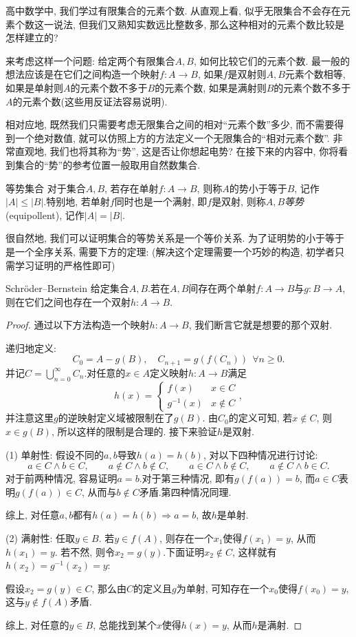 高中数学中, 我们学过有限集合的元素个数. 从直观上看, 似乎无限集合不会存在元素个数这一说法, 但我们又熟知实数远比整数多, 那么这种相对的元素个数比较是怎样建立的? 

来考虑这样一个问题: 给定两个有限集合$A, B$, 如何比较它们的元素个数. 最一般的想法应该是在它们之间构造一个映射$f: A \to B$, 如果$f$是双射则$A, B$元素个数相等, 如果是单射则$A$的元素个数不多于$B$的元素个数, 如果是满射则$B$的元素个数不多于$A$的元素个数(这些用反证法容易说明). 

相对应地, 既然我们只需要考虑无限集合之间的相对“元素个数”多少, 而不需要得到一个绝对数值, 就可以仿照上方的方法定义一个无限集合的“相对元素个数”. 非常直观地, 我们也将其称为“势”, 这是否让你想起电势? 在接下来的内容中, 你将看到集合的“势”的参考位置一般取用自然数集合. 

\begin{definition}{等势集合}
	对于集合$A, B$, 若存在单射$f: A \to B$, 则称$A$的势小于等于$B$, 记作$|A| \leq |B|$.特别地, 若单射$f$同时也是一个满射, 即$f$是双射, 则称$A, B$\textit{等势}(equipollent), 记作$|A|=|B|$.
\end{definition}

很自然地, 我们可以证明集合的等势关系是一个等价关系. 为了证明势的小于等于是一个全序关系, 需要下方的定理: (解决这个定理需要一个巧妙的构造, 初学者只需学习证明的严格性即可)

\begin{theorem}{Schröder–Bernstein}
	给定集合$A, B$.若在$A, B$间存在两个单射$f: A \to B$与$g: B \to A$, 则在它们之间也存在一个双射$h: A \to B$.
\end{theorem}
\begin{proof}
	通过以下方法构造一个映射$h: A \to B$, 我们断言它就是想要的那个双射. 
	
	递归地定义: $$C_0 = A - g(B), \quad C_{n+1}=g(f(C_n))~~\forall n \geq 0.$$
	并记$C = \bigcup_{n=0}^{\infty} C_n$.对任意的$x \in A$定义映射$h:  A\to B$满足$$h(x) = \begin{cases}
 f(x) &  x \in C \\
 g^{-1}(x) &  x \notin C
\end{cases}, $$并注意这里$g$的逆映射定义域被限制在了$g(B)$. 由$C_0$的定义可知, 若$x \notin C$, 则$x \in g(B)$, 所以这样的限制是合理的. 接下来验证$h$是双射. 

(1) 单射性: 假设不同的$a, b$导致$h(a)=h(b)$, 对以下四种情况进行讨论: $$a \in C \wedge b \in C, \qquad a \notin C \wedge b \notin C, \qquad a \in C \wedge b \notin C, \qquad a \notin C \wedge b \in C.$$
对于前两种情况, 容易证明$a=b$.对于第三种情况, 即有$g(f(a))=b$, 而$a \in C$表明$g(f(a)) \in C$, 从而与$b \notin C$矛盾.第四种情况同理. 

综上, 对任意$a, b$都有$h(a)=h(b) \Rightarrow a=b$, 故$h$是单射. 

(2) 满射性: 任取$y \in B$. 若$y \in f(A)$, 则存在一个$x_1$使得$f(x_1)=y$, 从而$h(x_1)=y$. 若不然, 则令$x_2=g(y)$.下面证明$x_2 \notin C$, 这样就有$h(x_2)=g^{-1}(x_2)=y$: 

假设$x_2=g(y) \in C$, 那么由$C$的定义且$g$为单射, 可知存在一个$x_0$使得$f(x_0)=y$, 这与$y \notin f(A)$矛盾. 

综上, 对任意的$y \in B$, 总能找到某个$x$使得$h(x)=y$, 从而$h$是满射.
\end{proof}


